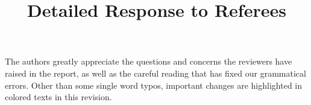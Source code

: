 \documentclass[10pt]{amsart}
\theoremstyle{definition}
\theoremstyle{remark}
\begin{document}
\title{\large Detailed Response to Referees}%

\date{}%

\maketitle

The authors greatly appreciate the questions and concerns the reviewers have raised in the report, as well as the careful reading that has fixed our grammatical errors. Other than some single word typos, important changes are highlighted in colored texts in this revision. 






\tableofcontents


\vskip0.5cm
\end{document}
